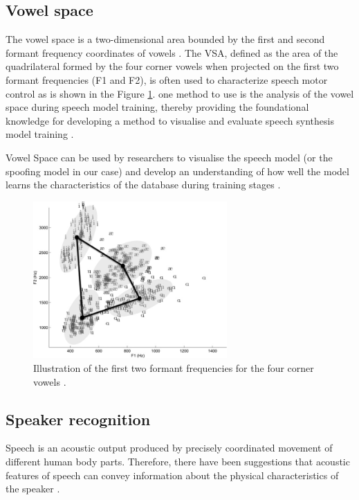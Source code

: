 \subsection{Vowel space}
The vowel space is a two-dimensional area bounded by the first and second formant frequency coordinates of vowels \cite{sandoval2013automatic}. The \ac{VSA}, defined as the area of the quadrilateral formed by the four corner vowels when projected on the first two formant frequencies (F1 and F2), is often used to characterize speech motor control \cite{berisha2014characterizing} as is shown in the Figure \ref{fig:vowel}. one method to use is the analysis of the vowel space during speech model training, thereby providing the foundational knowledge for developing a method to visualise and evaluate speech synthesis model training \cite{abeysinghe2022visualising}.

Vowel Space can be used by researchers to visualise the speech model (or the spoofing model in our case) and develop an understanding of how well the model learns the characteristics of the database during training stages \cite{abeysinghe2022visualising}.

\begin{figure}[htbp!]
    \centering
    \includegraphics[height=6cm]{figures/vowel_space.png}
    \caption{Illustration of the first two formant frequencies for the four corner vowels \cite{berisha2014characterizing}.}
    \label{fig:vowel}
\end{figure}

\subsection{Speaker recognition}
Speech is an acoustic output produced by precisely coordinated movement of different human body parts. Therefore, there have been suggestions that acoustic features of speech can convey information about the physical characteristics of the speaker \cite{gupta2022estimation}.

